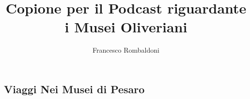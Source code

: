 \documentclass[hidelinks,12pt,a4paper]{article}
\begin{document}
	\begin{flushleft}
		
		\title{\textbf{Copione per il Podcast riguardante i Musei Oliveriani}}
		\author{Francesco Rombaldoni}
		\date{}
		
		\maketitle
		
		\setcounter{page}{1}
		\newpage
		
		\tableofcontents
		\newpage
		
		
		\section{Viaggi Nei Musei di Pesaro}
		

\end{flushleft}
\end{document}
